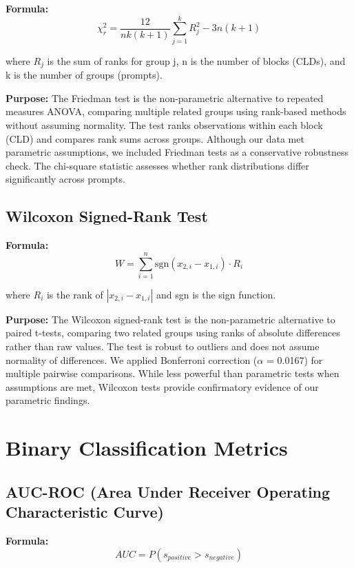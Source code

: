 \textbf{Formula:}
\begin{equation}
\chi_r^2 = \frac{12}{nk(k+1)} \sum_{j=1}^{k} R_j^2 - 3n(k+1)
\end{equation}

where $R_j$ is the sum of ranks for group j, n is the number of blocks (CLDs), and k is the number of groups (prompts).

\textbf{Purpose:} The Friedman test is the non-parametric alternative to repeated measures ANOVA, comparing multiple related groups using rank-based methods without assuming normality. The test ranks observations within each block (CLD) and compares rank sums across groups. Although our data met parametric assumptions, we included Friedman tests as a conservative robustness check. The chi-square statistic assesses whether rank distributions differ significantly across prompts.

\subsection{Wilcoxon Signed-Rank Test}

\textbf{Formula:}
\begin{equation}
W = \sum_{i=1}^{n} \text{sgn}(x_{2,i} - x_{1,i}) \cdot R_i
\end{equation}

where $R_i$ is the rank of $|x_{2,i} - x_{1,i}|$ and sgn is the sign function.

\textbf{Purpose:} The Wilcoxon signed-rank test is the non-parametric alternative to paired t-tests, comparing two related groups using ranks of absolute differences rather than raw values. The test is robust to outliers and does not assume normality of differences. We applied Bonferroni correction ($\alpha$ = 0.0167) for multiple pairwise comparisons. While less powerful than parametric tests when assumptions are met, Wilcoxon tests provide confirmatory evidence of our parametric findings.

\section{Binary Classification Metrics}

\subsection{AUC-ROC (Area Under Receiver Operating Characteristic Curve)}

\textbf{Formula:}
\begin{equation}
AUC = P(s_{positive} > s_{negative})
\end{equation}

